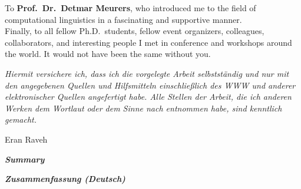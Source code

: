 \begin{center}
	To \textbf{Prof.\ Dr.\ Detmar Meurers}, who introduced me to the field of computational linguistics in a fascinating and supportive manner.\\[0.8cm]
	
	Finally, to all fellow Ph.D.\ students, fellow event organizers, colleagues, collaborators, and interesting people I met in conference and workshops around the world.
	It would not have been the same without you.\\[0.8cm]
\end{center}
\newpage


\mbox{}
\newpage
\begin{multicols}{2}
    \vspace*{\textheight}
    \columnbreak
    \vspace*{3cm}
	    \Large{\textit{Hiermit versichere ich, dass ich die vorgelegte Arbeit selbstst{\"a}ndig und nur mit den angegebenen Quellen und Hilfsmitteln einschließlich des WWW und anderer elektronischer Quellen angefertigt habe.
        Alle Stellen der Arbeit, die ich anderen Werken dem Wortlaut oder dem Sinne nach entnommen habe, sind kenntlich gemacht.}}
    \vspace{0.55cm}
    \begin{flushright}
		{Eran Raveh}
    \end{flushright}
\end{multicols}
\clearpage

\pagestyle{fancyplain}
\fancyhead{} %
\renewcommand{\headrulewidth}{0pt} %
\cfoot{} %
\fancyfoot[LO,RE]{\thepage} %
\setcounter{page}{1}

\begin{center}
	\textit{\textbf{\Huge Summary}}\\[1cm]
\end{center}

\clearpage

\begin{center}
	\textit{\textbf{\Huge Zusammenfassung (Deutsch)}}\\[1cm]
\end{center}
	
\cleardoublepage

